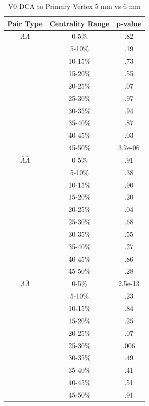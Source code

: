 \begin{table}
\begin{minipage}{18pc}
\begin{center}
\end{center}
\end{minipage}
\begin{minipage}{18pc}
\caption {V0 DCA to Primary Vertex 5 mm vs 6 mm} \label{tab:V0DcaPrimVertPvalueTests5mmVs6mm}
\begin{center}
\begin{tabular}{| c | c | c |}
  \hline                       
  Pair Type & Centrality Range & p-value \\
  \hline
  $\Lambda\Lambda$ & 0-5\% &  .82 \\
   & 5-10\%  & .19 \\
   & 10-15\% & .73 \\
   & 15-20\% & .55 \\
   & 20-25\% & .07 \\
   & 25-30\% & .97 \\
   & 30-35\% & .94 \\
   & 35-40\% & .87 \\
   & 40-45\% & .03 \\
   & 45-50\% & 3.7e-06 \\
   \hline
  $\bar{\Lambda}\bar{\Lambda}$ &  0-5\% & .91 \\
   & 5-10\% & .38 \\
   & 10-15\% & .90 \\
   & 15-20\% & .20 \\
   & 20-25\% & .04 \\
   & 25-30\% & .68 \\
   & 30-35\% & .55 \\
   & 35-40\% & .27 \\
   & 40-45\% & .86 \\
   & 45-50\% & .28 \\
   \hline
  $\Lambda\bar{\Lambda}$ &  0-5\% & 2.5e-13 \\
   & 5-10\% & .23 \\
   & 10-15\% & .84 \\
   & 15-20\% & .25 \\
   & 20-25\% & .07 \\
   & 25-30\% & .006 \\
   & 30-35\% & .49 \\
   & 35-40\% & .41 \\
   & 40-45\% & .51 \\
   & 45-50\% & .91 \\
  \hline  
\end{tabular}
\end{center}
\end{minipage}
\end{table}




